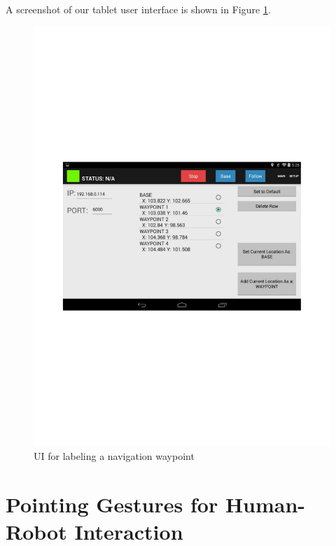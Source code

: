 A screenshot of our tablet user interface is shown in Figure \ref{fig:ui}.

\begin{figure}[ht!]
\centering
\includegraphics[width=1.0\textwidth]{pics/ui}
\caption{UI for labeling a navigation waypoint}
\label{fig:ui}
\end{figure}

\section{Pointing Gestures for Human-Robot Interaction}
\label{sec:pointing_gestures}

